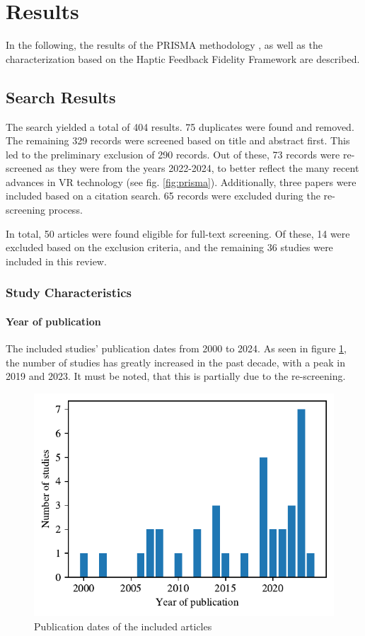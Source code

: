 \section{Results}
\label{sec:results}

In the following, the results of the PRISMA methodology \cite{Page2021TheReviews}, as well as the characterization based on the Haptic Feedback Fidelity Framework \cite{Muender2022HapticReality} are described.


\subsection{Search Results}

The search yielded a total of 404 results. 75 duplicates were found and removed. The remaining 329 records were screened based on title and abstract first. This led to the preliminary exclusion of 290 records. Out of these, 73 records were re-screened as they were from the years 2022-2024, to better reflect the many recent advances in VR technology (see fig. \ref{fig:prisma}). 
Additionally, three papers were included based on a citation search. 65 records were excluded during the re-screening process.

In total, 50 articles were found eligible for full-text screening. Of these, 14 were excluded based on the exclusion criteria, and the remaining 36 studies were included in this review.


\subsubsection{Study Characteristics}
\paragraph{Year of publication}
The included studies' publication dates from 2000 to 2024. As seen in figure \ref{fig:years}, the number of studies has greatly increased in the past decade, with a peak in 2019 and 2023. It must be noted, that this is partially due to the re-screening. 


\begin{figure}[htbp]
    \centering
    \includegraphics[width=0.8\columnwidth]{figures/years.pdf} 
    \caption{Publication dates of the included articles}
    \label{fig:years}
\end{figure} 


